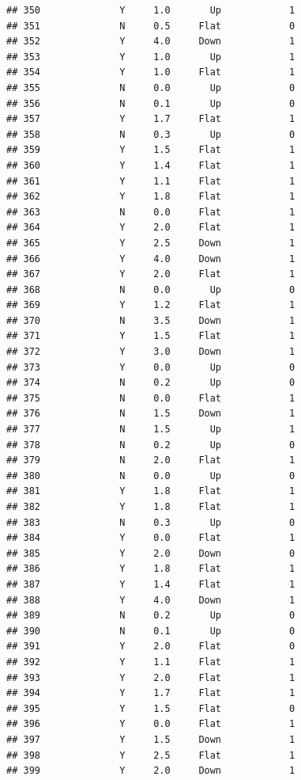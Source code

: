 \documentclass[
]{article}
\begin{document}
\begin{verbatim}
## 350              Y     1.0       Up            1
## 351              N     0.5     Flat            0
## 352              Y     4.0     Down            1
## 353              Y     1.0       Up            1
## 354              Y     1.0     Flat            1
## 355              N     0.0       Up            0
## 356              N     0.1       Up            0
## 357              Y     1.7     Flat            1
## 358              N     0.3       Up            0
## 359              Y     1.5     Flat            1
## 360              Y     1.4     Flat            1
## 361              Y     1.1     Flat            1
## 362              Y     1.8     Flat            1
## 363              N     0.0     Flat            1
## 364              Y     2.0     Flat            1
## 365              Y     2.5     Down            1
## 366              Y     4.0     Down            1
## 367              Y     2.0     Flat            1
## 368              N     0.0       Up            0
## 369              Y     1.2     Flat            1
## 370              N     3.5     Down            1
## 371              Y     1.5     Flat            1
## 372              Y     3.0     Down            1
## 373              Y     0.0       Up            0
## 374              N     0.2       Up            0
## 375              N     0.0     Flat            1
## 376              N     1.5     Down            1
## 377              N     1.5       Up            1
## 378              N     0.2       Up            0
## 379              N     2.0     Flat            1
## 380              N     0.0       Up            0
## 381              Y     1.8     Flat            1
## 382              Y     1.8     Flat            1
## 383              N     0.3       Up            0
## 384              Y     0.0     Flat            1
## 385              Y     2.0     Down            0
## 386              Y     1.8     Flat            1
## 387              Y     1.4     Flat            1
## 388              Y     4.0     Down            1
## 389              N     0.2       Up            0
## 390              N     0.1       Up            0
## 391              Y     2.0     Flat            0
## 392              Y     1.1     Flat            1
## 393              Y     2.0     Flat            1
## 394              Y     1.7     Flat            1
## 395              Y     1.5     Flat            0
## 396              Y     0.0     Flat            1
## 397              Y     1.5     Down            1
## 398              Y     2.5     Flat            1
## 399              Y     2.0     Down            1

\end{verbatim}
\end{document}
